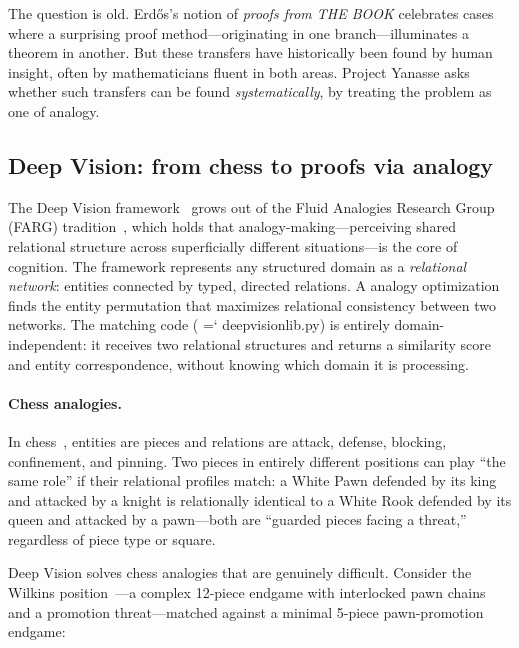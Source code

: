 \documentclass[11pt]{article}
\renewcommand{\texttt}[1]{%
  \begingroup\ttfamily\hyphenchar\font=`\-\relax
  \def\_{\textunderscore\discretionary{}{}{}}%
  #1\endgroup}
\theoremstyle{definition}
\theoremstyle{remark}
\begin{document}
The question is old.  Erd\H{o}s's notion of \emph{proofs from THE BOOK}
celebrates cases where a surprising proof method---originating in one
branch---illuminates a theorem in another.  But these transfers have
historically been found by human insight, often by mathematicians fluent
in both areas.  Project Yanasse asks whether such transfers can be
found \emph{systematically}, by treating the problem as one of
analogy.

\subsection{Deep Vision: from chess to proofs via analogy}

The Deep Vision framework~\cite{linhares_deep_vision,
linhares2024deepvision} grows out of the Fluid Analogies Research
Group (FARG) tradition~\cite{hofstadter_fluid_1995, hofstadter_go_1999,
hofstadter_surfaces_2013, hofstadter_copycat_1984,
mitchell_emergence_1990, chalmers_high-level_1992, french_tabletop_1991,
foundalis_phaeaco_2006, rehling_letter_2001, nichols_musicat_2012},
which holds that analogy-making---perceiving shared relational structure
across superficially different situations---is the core of cognition.
The framework represents any structured domain as a \emph{relational
network}: entities connected by typed, directed relations.  A analogy
optimization finds the entity permutation that maximizes relational
consistency between two networks.  The matching code
(\texttt{deep\_vision\_lib.py}) is entirely domain-independent: it
receives two relational structures and returns a similarity score and
entity correspondence, without knowing which domain it is processing.

\paragraph{Chess analogies.}  In chess~\cite{linhares_active_2005,
linhares_understanding_2007, linhares_questioning_2010,
linhares_entanglement_2012, linhares_what_2013,
linhares_emergence_2014}, entities are pieces and relations are attack,
defense, blocking, confinement, and pinning.  Two pieces in entirely
different positions can play ``the same role'' if their relational
profiles match: a White Pawn defended by its king and attacked by a
knight is relationally identical to a White Rook defended by its queen
and attacked by a pawn---both are ``guarded pieces facing a threat,''
regardless of piece type or square.

Deep Vision solves chess analogies that are genuinely difficult.
Consider the Wilkins position~\cite{linhares_active_2005}---a complex
12-piece endgame with interlocked pawn chains and a promotion
threat---matched against a minimal 5-piece pawn-promotion endgame:
\end{document}
